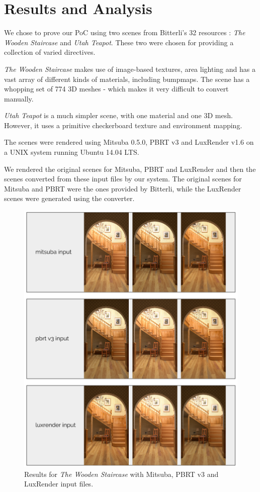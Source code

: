 \section{Results and Analysis}
We chose to prove our PoC using two scenes from Bitterli's 32 resources \cite{resources16}: \textit{The Wooden Staircase} and \textit{Utah Teapot}. These two were chosen for providing a collection of varied directives.

\textit{The Wooden Staircase} makes use of image-based textures, area lighting and has a vast array of different kinds of materials, including bumpmaps. The scene has a whopping set of 774 3D meshes - which makes it very difficult to convert manually.

\textit{Utah Teapot} is a much simpler scene, with one material and one 3D mesh. However, it uses a primitive checkerboard texture and environment mapping.

The scenes were rendered using Mitsuba 0.5.0, PBRT v3 and LuxRender v1.6 on a UNIX system running Ubuntu 14.04 LTS.

We rendered the original scenes for Mitsuba, PBRT and LuxRender and then the scenes converted from these input files by our system. The original scenes for Mitsuba and PBRT were the ones provided by Bitterli, while the LuxRender scenes were generated using the converter.

\begin{figure}[h]
\centering
\includegraphics[width=5in]{figs/4_results/results_staircase.png}
\caption{Results for \textit{The Wooden Staircase} with Mitsuba, PBRT v3 and LuxRender input files.}
\label{fig:staircase}
\end{figure}

